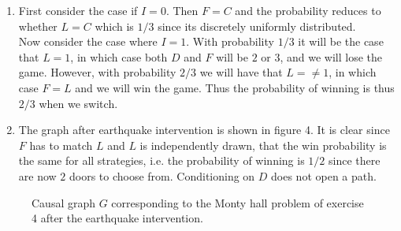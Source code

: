 \begin{gradedsolution}
\begin{enumerate}
\begin{itemize}
      \item If $I=1$, then by the generative process we only have to concern ourselves with the case where $c \neq d$, in which case $P(F=f|Do(I=0, C=c, D=d) = 1 - \delta_{\{c,d\}}(f)$. If $c = d$ we may define the Markov kernel as some arbitrary distribution over $F$.
    \end{itemize}  
     Finally, $P(O \given do(F, L))$ is defined by the probability mass function $P(O=1 \given do(F=f, L=l)) = \delta_{\{l\}}(f)$.
     \item First consider the case if $I=0$. Then $F=C$ and the probability reduces to whether $L=C$ which is $1/3$ since its discretely uniformly distributed.\\
     
     Now consider the case where $I=1$. With probability $1/3$ it will be the case that $L=1$, in which case both $D$ and $F$ will be $2$ or $3$, and we will lose the game. However, with probability $2/3$ we will have that $L=\neq 1$, in which case $F=L$ and we will win the game. Thus the probability of winning is thus $2/3$ when we switch.
     \item The graph after earthquake intervention is shown in figure 4. It is clear since $F$ has to match $L$ and $L$ is independently drawn, that the win probability is the same for all strategies, i.e. the probability of winning is $1/2$ since there are now $2$ doors to choose from. Conditioning on $D$ does not open a path.
  \end{enumerate}
  
  \begin{figure}[ht]
    \centering
  \caption{Causal graph $G$ corresponding to the Monty hall problem of exercise 4 after the earthquake intervention.}
  \label{fig:mh2}
  \end{figure}
\end{gradedsolution}

